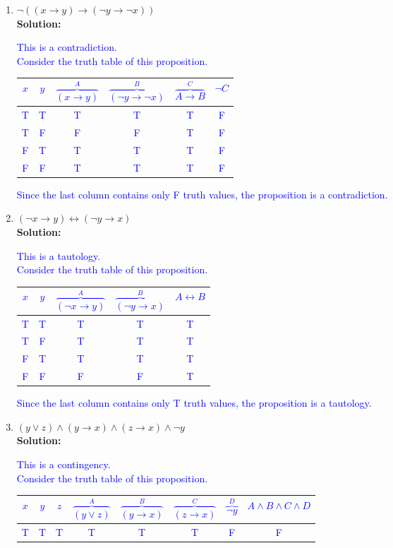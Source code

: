 \documentclass{article}
\renewcommand{\implies}{\rightarrow}
\newcommand{\same}{\leftrightarrow}
\newcommand{\sol}[1]{\textbf{Solution:\,}\textcolor{blue}{#1}}
\begin{document}
\begin{enumerate}
\begin{enumerate}
\item $\neg((x \implies y) \implies (\neg y \implies \neg x))$\\
\sol{This is a contradiction. \\
Consider the truth table of this proposition.
\begin{center}
\begin{tabular}{cc|cccc}
$x$ & $y$ 
& $\overbrace{(x \implies y)}^A$ 
& $\overbrace{(\neg y \implies \neg x)}^B$ 
& $\overbrace{A\implies B}^C$ 
& $\neg C$ \\\hline
T & T & T & T & T & F\\
T & F & F & F & T & F\\
F & T & T & T & T & F\\
F & F & T & T & T & F\\ 
\end{tabular}
\end{center}
Since the last column contains only F truth values, the proposition is a contradiction.}
\item $(\neg x \implies y) \same (\neg y \implies x)$\\
\sol{This is a tautology. \\
Consider the truth table of this proposition.
\begin{center}
\begin{tabular}{cc|ccc}
$x$ & $y$ 
& $\overbrace{(\neg x \implies y)}^A$ 
& $\overbrace{(\neg y \implies x)}^B$ 
& $A\leftrightarrow B$\\\hline
T & T & T & T & T\\
T & F & T & T & T\\
F & T & T & T & T\\
F & F & F & F & T\\ 
\end{tabular}
\end{center}
Since the last column contains only T truth values, the proposition is a tautology.}
\item $(y \lor z) \land (y \implies x) \land (z \implies x) \land \neg y$
\\\sol{This is a contingency. \\
Consider the truth table of this proposition.
\begin{center}
\begin{tabular}{ccc|ccccc}
$x$ & $y$ & $z$
& $\overbrace{(y \lor z)}^A$ 
& $\overbrace{(y \implies x)}^B$ 
& $\overbrace{(z\implies x)}^C$ 
& $\overbrace{\neg y}^D$ 
& $A \land B \land C \land D$
\\\hline
T & T & T & T & T & T & F & F\\

\end{tabular}
\end{center}}
\end{enumerate}
\end{enumerate}
\end{document}
